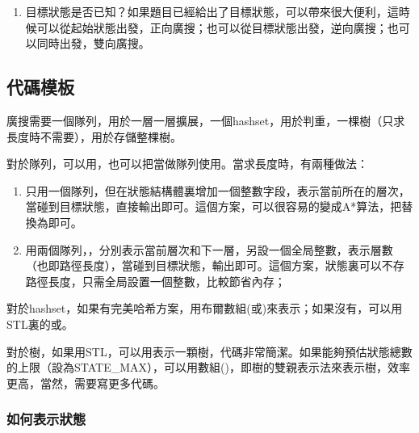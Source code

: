 \begin{enumerate}
\item 目標狀態是否已知？如果題目已經給出了目標狀態，可以帶來很大便利，這時候可以從起始狀態出發，正向廣搜；也可以從目標狀態出發，逆向廣搜；也可以同時出發，雙向廣搜。
\end{enumerate}


\subsection{代碼模板}
廣搜需要一個隊列，用於一層一層擴展，一個hashset，用於判重，一棵樹（只求長度時不需要），用於存儲整棵樹。

對於隊列，可以用，也可以把當做隊列使用。當求長度時，有兩種做法：
\begin{enumerate}
\item 只用一個隊列，但在狀態結構體裏增加一個整數字段，表示當前所在的層次，當碰到目標狀態，直接輸出即可。這個方案，可以很容易的變成A*算法，把替換為即可。
\item 用兩個隊列，，分別表示當前層次和下一層，另設一個全局整數，表示層數（也即路徑長度），當碰到目標狀態，輸出即可。這個方案，狀態裏可以不存路徑長度，只需全局設置一個整數，比較節省內存；
\end{enumerate}

對於hashset，如果有完美哈希方案，用布爾數組(或)來表示；如果沒有，可以用STL裏的或。

對於樹，如果用STL，可以用表示一顆樹，代碼非常簡潔。如果能夠預估狀態總數的上限（設為STATE_MAX），可以用數組()，即樹的雙親表示法來表示樹，效率更高，當然，需要寫更多代碼。


\subsubsection{如何表示狀態}

